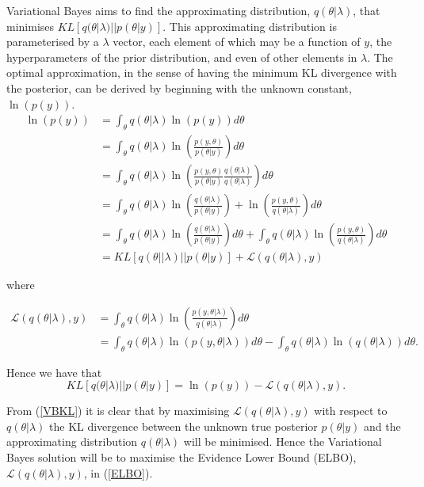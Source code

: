 \documentclass{article}\usepackage[]{graphicx}\usepackage[]{color}
\numberwithin{equation}{section}
\begin{document}
\newpage

Variational Bayes aims to find the approximating distribution, $q(\theta | \lambda)$, that minimises $KL[q(\theta | \lambda)||p(\theta |y)]$. This approximating distribution is parameterised by a $\lambda$ vector, each element of which may be a function of $y$, the hyperparameters of the prior distribution, and even of other elements in $\lambda$. The optimal approximation, in the sense of having the minimum KL divergence with the posterior, can be derived by beginning with the unknown constant, $\ln(p(y))$.
\begin{align}
\ln(p(y)) &= \int_{\theta} q(\theta|\lambda) \ln(p(y)) d\theta \nonumber \\
&= \int_{\theta} q(\theta|\lambda) \ln  \left( \frac{p(y, \theta)}{p(\theta | y)} \right) d\theta \nonumber \\
&= \int_{\theta} q(\theta|\lambda) \ln  \left( \frac{p(y, \theta)}{p(\theta | y)} \frac{q(\theta|\lambda)}{q(\theta|\lambda)}\right) d\theta \nonumber \\
&= \int_{\theta} q(\theta|\lambda) \ln  \left( \frac{q(\theta|\lambda)}{p(\theta | y)}\right) + \ln \left( \frac{p(y, \theta)}{q(\theta|\lambda)} \right) d\theta \nonumber \\
&= \int_{\theta} q(\theta|\lambda) \ln  \left( \frac{q(\theta|\lambda)}{p(\theta | y)}\right) d\theta + \int_{\theta} q(\theta|\lambda) \ln \left( \frac{p(y, \theta)}{q(\theta|\lambda)} \right) d\theta \nonumber \\
&= KL [q(\theta||\lambda) || p(\theta | y)] + \mathcal{L}(q(\theta | \lambda), y) \nonumber
\end{align}


where 

\begin{align}
\mathcal{L}(q(\theta|\lambda), y) &= \int_{\theta} q(\theta|\lambda) \ln \left( \frac{p(y, \theta|\lambda)}{q(\theta|\lambda)} \right) d\theta \nonumber \\
&=  \int_{\theta} q(\theta|\lambda) \ln (p(y, \theta|\lambda)) d\theta -  \int_{\theta} q(\theta|\lambda) \ln (q(\theta|\lambda)) d\theta. \label{ELBO}
\end{align}

Hence we have that
\begin{equation}
\label{VBKL}
KL [q(\theta|\lambda) || p(\theta | y)] = \ln(p(y)) - \mathcal{L}(q(\theta | \lambda), y).
\end{equation}

From (\ref{VBKL}) it is clear that by maximising $\mathcal{L}(q(\theta | \lambda), y)$ with respect to $q(\theta|\lambda)$ the KL divergence between the unknown true posterior $p(\theta|y)$ and the approximating distribution $q(\theta|\lambda)$ will be minimised.
Hence the Variational Bayes solution will be to maximise the Evidence Lower Bound (ELBO), $\mathcal{L}(q(\theta|\lambda), y)$, in (\ref{ELBO}).
\end{document}
